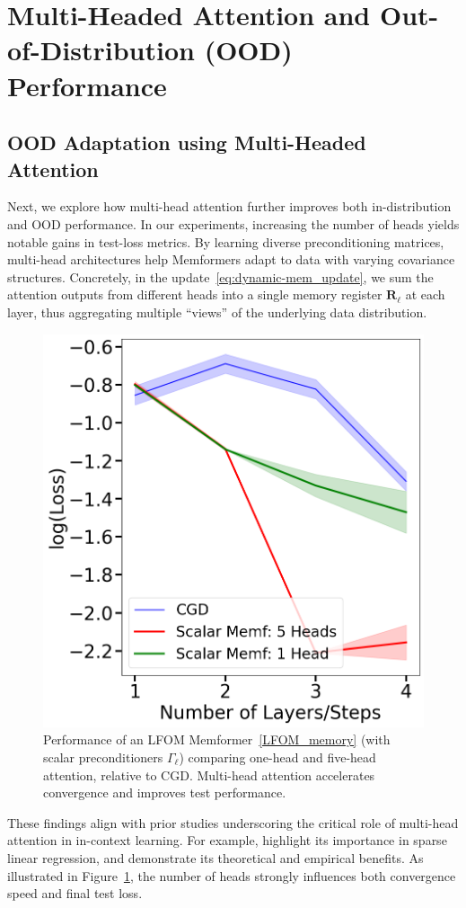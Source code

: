 \documentclass[11pt]{article}
\theoremstyle{plain}
\theoremstyle{definition}
\theoremstyle{remark}
\numberwithin{equation}{section}
\begin{document}
\section{Multi-Headed Attention and Out-of-Distribution (OOD) Performance}
\label{Section:Multi-Headed_Attention}
\subsection{OOD Adaptation using Multi-Headed Attention}
Next, we explore how multi-head attention further improves both in-distribution and OOD performance. In our experiments, increasing the number of heads yields notable gains in test-loss metrics. By learning diverse preconditioning matrices, multi-head architectures help Memformers adapt to data with varying covariance structures. Concretely, in the update~\eqref{eq:dynamic-mem_update}, we sum the attention outputs from different heads into a single memory register \(\mathbf{R}_\ell\) at each layer, thus aggregating multiple “views” of the underlying data distribution.
\begin{figure}[t]
  \centering
  \includegraphics[width=0.7\linewidth]{5head_attention_experiment.png}
  \caption{%
  Performance of an LFOM Memformer~\eqref{LFOM_memory} (with scalar
  preconditioners \(\Gamma_\ell\)) comparing one-head and five-head
  attention, relative to CGD. Multi-head attention accelerates convergence
  and improves test performance.}
  \label{fig:5head_attention_experiment}
\end{figure}
These findings align with prior studies underscoring the critical role of multi-head attention in in-context learning. For example, \citet{chen2024transformers} highlight its importance in sparse linear regression, and \citet{cui2024superiority} demonstrate its theoretical and empirical benefits. As illustrated in Figure~\ref{fig:5head_attention_experiment}, the number of heads strongly influences both convergence speed and final test loss.
\end{document}
